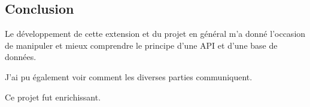 \subsection{Conclusion}

\begin{flushleft}
Le développement de cette extension et du projet en général m'a donné l'occasion de manipuler et mieux comprendre le principe d'une API et d'une base de données.
\end{flushleft}
\begin{flushleft}
J'ai pu également voir comment les diverses parties communiquent.
\end{flushleft}
\begin{flushleft}
Ce projet fut enrichissant.
\end{flushleft}

